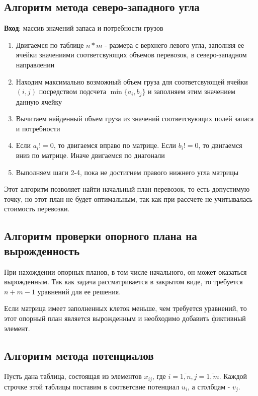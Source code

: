 \documentclass[../body.tex]{subfiles}
\begin{document}
\subsection{Алгоритм метода северо-западного угла}
	\textbf{Вход}: массив значений запаса и потребности грузов
	\begin{enumerate}
		\item Двигаемся по таблице $n*m$ - размера с верхнего левого угла, заполняя ее ячейки значениями соответсвующих объемов перевозок, в северо-западном направлении
		\item Находим максимально возможный объем груза для соответсвующей ячейки $(i,j)$ посредством подсчета $\min{\{a_i,b_j\}}$ и заполняем этим значением данную ячейку
		\item Вычитаем найденный объем груза из значений соответсвующих полей запаса и потребности
		\item Если $a_i != 0$, то двигаемся вправо по матрице. Если $b_i != 0$, то двигаемся вниз по матрице. Иначе двигаемся по диагонали
		\item Выполняем шаги 2-4, пока не достигнем правого нижнего угла матрицы
	\end{enumerate}
	
    Этот алгоритм позволяет найти начальный план перевозок, то есть допустимую точку, но этот план не будет оптимальным, так как при рассчете не учитывалась стоимость перевозки.
    
\subsection{Алгоритм проверки опорного плана на вырожденность}
    При нахождении опорных планов, в том числе начального, он может оказаться вырожденным. Так как задача рассматривается в закрытом виде, то требуется $n+m-1$ уравнений для ее решения.
    
    Если матрица имеет заполненных клеток меньше, чем требуется уравнений, то этот опорный план является вырожденным и необходимо добавить фиктивный элемент.

\subsection{Алгоритм метода потенциалов}
    Пусть дана таблица, состоящая из элементов $x_{ij}$, где $i=\overline{1,n},j=\overline{1,m}$. Каждой строчке этой таблицы поставим в соответсвие потенциал $u_i$, а столбцам - $v_j$.
    
\end{document}
